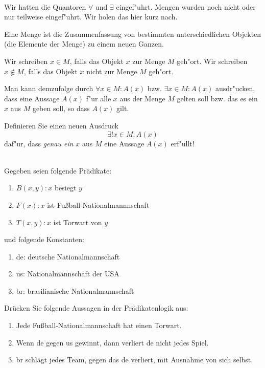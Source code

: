  \\
Wir hatten die Quantoren $\forall$ und $\exists$ eingef"uhrt. Mengen wurden noch nicht oder nur teilweise eingef"uhrt. 
Wir holen das hier kurz nach.
\begin{notes}
	Eine Menge ist die Zusammenfassung von bestimmten unterschiedlichen Objekten (die Elemente der Menge) zu einem neuen Ganzen.
	
	Wir schreiben $x\in M$, falls das Objekt $x$ zur Menge $M$ geh"ort.
	Wir schreiben $x\notin M$, falls das Objekt $x$ nicht zur Menge $M$ geh"ort. 
\end{notes}
Man kann demzufolge durch $\forall x\in M: A(x)$ bzw. $\exists x\in M: A(x)$ ausdr"ucken, dass eine Aussage $A(x)$ f"ur alle $x$ aus der Menge $M$ gelten soll bzw.
das es ein $x$ aus $M$ geben soll, so dass $A(x)$ gilt.

Definieren Sie einen neuen Ausdruck \[\exists !x\in M:A(x)\] daf"ur, dass \textit{genau ein} $x$ aus $M$ eine Aussage $A(x)$ erf"ullt!


 \\
Gegeben seien folgende Prädikate: 
\begin{enumerate}
  \item $B(x,y): x$ besiegt $y$ 
  \item $F(x): x$ ist Fußball-Nationalmannnschaft
  \item $T(x,y): x$ ist Torwart von $y$
\end{enumerate}
und folgende Konstanten: 
\begin{enumerate}
  \item de: deutsche Nationalmannschaft
  \item us: Nationalmannschaft der USA
  \item br: brasilianische Nationalmannschaft
\end{enumerate} 
Drücken Sie folgende Aussagen in der Prädikatenlogik aus: 
\begin{enumerate}
  \item Jede Fußball-Nationalmannschaft hat einen Torwart.
  \item Wenn de gegen us gewinnt, dann verliert de nicht jedes Spiel.
  \item br schlägt jedes Team, gegen das de verliert, mit Ausnahme von sich selbst.
\end{enumerate} 


